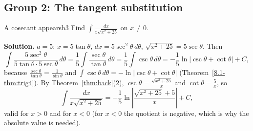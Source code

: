 \documentclass[11pt]{article}
\begin{document}
\subsection*{Group 2: The tangent substitution}

\begin{exmp}{A cosecant appears}{b3}
Find $\int\frac{dx}{x\sqrt{x^2+25}}$ on $x\ne0$.

\textbf{Solution.} $a=5$: $x=5\tan\theta$, $dx=5\sec^2\theta\,d\theta$, $\sqrt{x^2+25}=5\sec\theta$. Then
\[\int\frac{5\sec^2\theta}{5\tan\theta\cdot5\sec\theta}\,d\theta=\frac15\int\frac{\sec\theta}{\tan\theta}\,d\theta=\frac15\int\csc\theta\,d\theta=-\frac15\ln\lvert\csc\theta+\cot\theta\rvert+C,\]
because $\frac{\sec\theta}{\tan\theta}=\frac1{\sin\theta}$ and $\int\csc\theta\,d\theta=-\ln\lvert\csc\theta+\cot\theta\rvert$ (Theorem~\ref{8.1-thm:trig4}). By Theorem~\ref{thm:back}(2), $\csc\theta=\frac{\sqrt{x^2+25}}x$ and $\cot\theta=\frac5x$, so
\[\int\frac{dx}{x\sqrt{x^2+25}}=-\frac15\ln\left\lvert\frac{\sqrt{x^2+25}+5}x\right\rvert+C ,\]
valid for $x>0$ and for $x<0$ (for $x<0$ the quotient is negative, which is why the absolute value is needed).
\end{exmp}
\end{document}
